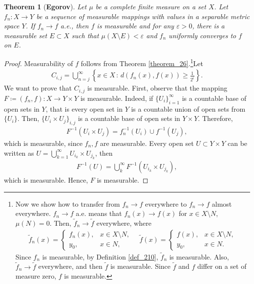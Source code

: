 \documentclass[11pt]{book}
\newtheorem{theorem}{Theorem}[chapter]
\theoremstyle{definition}
\numberwithin{equation}{chapter}
\begin{document}
\begin{theorem}[{\bf Egorov}]\label{theorem_223}
Let $\mu$ be a complete finite measure on a set $X$. Let $f_n: X \to Y$ be a sequence of measurable mappings with values in a separable metric space $Y$. If $f_n \to f$ a.e., then $f$ is measurable and for any $\varepsilon > 0$, there is a measurable set $E \subset X$ such that $\mu(X \setminus E) < \varepsilon$ and $f_n$ uniformly converges to $f$ on $E$.
\end{theorem}
\begin{proof}
Measurability of $f$ follows from Theorem \ref{theorem_26}.\footnote{Now we show how to transfer from $f_n \to f$ everywhere to $f_n \to f$ almost everywhere. $f_n \to f$ a.e. means that $f_n(x) \to f(x)$ for $x \in X \setminus N$, $\mu(N) = 0$. Then, $\widetilde{f}_n \to \widetilde{f}$ everywhere, where
\begin{align*}
    \widetilde{f}_n(x) = \begin{cases}
        f_n(x), & x \in X \setminus N,\\
        y_0, & x \in N,
    \end{cases} \quad 
    \widetilde{f}(x) = \begin{cases}
        f(x), & x \in X \setminus N,\\
        y_0, & x \in N.
    \end{cases}
\end{align*}
Since $f_n$ is measurable, by Definition \ref{def_210}, $\widetilde{f}_n$ is measurable. Also, $\widetilde{f}_n \to \widetilde{f}$ everywhere, and then $\widetilde{f}$ is measurable. Since $\widetilde{f}$ and $f$ differ on a set of measure zero, $f$ is measurable.}Let
\begin{align*}
    C_{i,j} = \bigcup^\infty_{n=j} \left\{x \in X \,:\, d(f_n(x),f(x)) \geq \frac{1}{2^i}\right\}.
\end{align*}
We want to prove that $C_{i,j}$ is measurable. First, observe that the mapping $F \coloneqq (f_n,f): X \to Y \times Y$ is measurable. Indeed, if $\{U_i\}^\infty_{i=1}$ is a countable base of open sets in $Y$, that is every open set in $Y$ is a countable union of open sets from $\{U_i\}$. Then, $\{U_i \times U_j\}_{i,j}$ is a countable base of open sets in $Y \times Y$. Therefore,
\begin{align*}
    F^{-1}(U_i \times U_j) = f_n^{-1}(U_i) \cup f^{-1}(U_j),
\end{align*}
which is measurable, since $f_n, f$ are measurable. Every open set $U \subset Y \times Y$ can be written as $U = \bigcup^\infty_{k=1} U_{i_k} \times U_{j_k}$, then
\begin{align*}
    F^{-1}(U) = \bigcup^\infty_k F^{-1}\left(U_{i_k} \times U_{j_k}\right),
\end{align*}
which is measurable. Hence, $F$ is measurable.


\end{proof}
\end{document}
